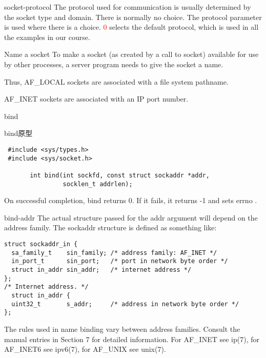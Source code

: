\documentclass{beamer}
\begin{document}
\begin{frame}{socket-protocol}
The protocol used for communication is usually determined by the socket type and domain. There is normally no choice. The protocol parameter is used where there is a choice. \textcolor{red}{0 }selects the default protocol, which is used in all the examples in our course.
\end{frame}
\begin{frame}{Name a socket}
To make a socket (as created by a call to socket) available for use by other processes, a server program needs to give the socket a name. 

Thus, AF\_LOCAL sockets are associated with a file system pathname. 

AF\_INET sockets are associated with an IP port number.
\end{frame}
\begin{frame}[fragile]{bind}
\begin{block}{bind原型}
\begin{verbatim}
 #include <sys/types.h>          
 #include <sys/socket.h>

       int bind(int sockfd, const struct sockaddr *addr,
                socklen_t addrlen);
\end{verbatim}
\end{block}

On successful completion, bind returns 0. If it fails, it returns -1 and sets errno .
\end{frame}
\begin{frame}[fragile]{bind-addr}       
       The actual structure passed for the addr argument will depend on the address family.  The sockaddr structure is defined as something like:
\begin{verbatim}
struct sockaddr_in {
  sa_family_t    sin_family; /* address family: AF_INET */
  in_port_t      sin_port;   /* port in network byte order */
  struct in_addr sin_addr;   /* internet address */
};
/* Internet address. */
  struct in_addr {
  uint32_t       s_addr;     /* address in network byte order */
};
\end{verbatim}
The rules used in name binding vary between address families.  Consult the manual entries in Section 7 for detailed information.  For AF\_INET see ip(7), for AF\_INET6 see  ipv6(7),  for  AF\_UNIX  see
       unix(7).
\end{frame}
\end{document}
